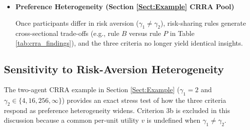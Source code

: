 \begin{itemize}
    \item \textbf{Preference Heterogeneity (Section \ref{Sect:Example} CRRA Pool)}
    
    Once participants differ in risk aversion ($\gamma_1 \neq \gamma_2$), risk-sharing rules generate cross-sectional trade-offs (e.g., rule $B$ versus rule $P$ in Table \ref{tab:crra_findings}), and the three criteria no longer yield identical insights.
\end{itemize}

\subsection{Sensitivity to Risk-Aversion Heterogeneity}
The two-agent CRRA example in Section \ref{Sect:Example} ($\gamma_1 = 2$ and $\gamma_2 \in \{4, 16, 256, \infty\}$) provides an exact stress test of how the three criteria respond as preference heterogeneity widens. Criterion 3b is excluded in this discussion because a common per-unit utility $v$ is undefined when $\gamma_1 \neq \gamma_2$.
